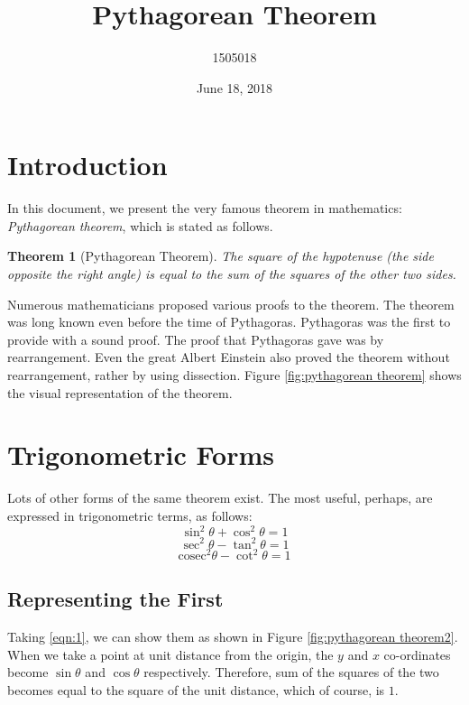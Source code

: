 \documentclass{article}
\title{Pythagorean Theorem}
\author{1505018}
\date{June 18, 2018}
\begin{document}
\maketitle
\newtheorem{theorem}{Theorem}[section]
\section{Introduction}

In this document, we present the very famous theorem in mathematics: \textit{Pythagorean theorem}, which is stated as follows.

\begin{theorem}[Pythagorean Theorem]
The square of the hypotenuse (the side opposite the right angle) is equal to the sum of the squares of the other two sides.
\end{theorem}
Numerous mathematicians proposed various proofs to the theorem. The theorem was long known even before the time of Pythagoras. Pythagoras was the first to provide with a sound proof. The proof that Pythagoras gave was by rearrangement. Even the great Albert Einstein also proved the theorem without rearrangement, rather by using dissection. Figure \ref{fig:pythagorean theorem} shows the visual representation of the theorem.


\newpage


\section{Trigonometric Forms}
Lots of other forms of the same theorem exist. The most useful, perhaps, are expressed in trigonometric terms, as follows:
\begin{equation}
    \sin^2{\theta} + \cos^2{\theta} = 1 
    \label{eqn:1}
\end{equation}
\begin{equation}
    \sec^2{\theta} - \tan^2{\theta} = 1 
    \label{eqn:2}
\end{equation}
\begin{equation}
    \mathrm{cosec}^2{\theta} - \cot^2{\theta} = 1 
    \label{eqn:3}
\end{equation}


\subsection{Representing the First}
Taking \ref{eqn:1}, we can show them as shown in Figure \ref{fig:pythagorean theorem2}. When we take a point at unit distance from the origin, the $y$ and $x$ co-ordinates become $\sin\theta$ and $\cos\theta$ respectively. Therefore, sum of the squares of the two becomes equal to the square of the unit distance, which of course, is $1$.
\end{document}
